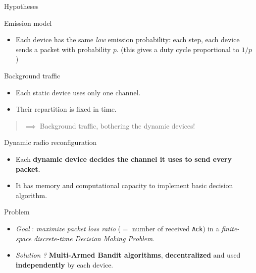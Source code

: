 \documentclass[12pt,english,ignorenonframetext,]{beamer}
\providecommand{\tightlist}{%
  \setlength{\itemsep}{0pt}\setlength{\parskip}{0pt}}
\begin{document}
\begin{frame}{Hypotheses}

\begin{block}{Emission model}

\begin{itemize}
\tightlist
\item
  Each device has the same \emph{low} emission probability: \newline
   each step, each device sends a packet with probability \(p\).
  \newline
   \hfill{}\small{(this gives a duty cycle proportional to $1/p$)}
\end{itemize}

\end{block}

\begin{block}{Background traffic}

\begin{itemize}
\tightlist
\item
  Each static device uses only one channel.
\item
  Their repartition is fixed in time.
\end{itemize}

\end{block}

\begin{quote}
\(\implies\) Background traffic, bothering the dynamic devices!
\end{quote}

\begin{block}{Dynamic radio reconfiguration}

\begin{itemize}
\tightlist
\item
  Each \textbf{dynamic device decides the channel it uses to send every
  packet}.
\item
  It has memory and computational capacity to implement basic decision
  algorithm.
\end{itemize}

\end{block}

\begin{block}{Problem}

\begin{itemize}
\tightlist
\item
  \emph{Goal} : \emph{maximize packet loss ratio} (\(=\) number of
  received \texttt{Ack}) in a \emph{finite-space discrete-time Decision
  Making Problem}.
\item
  \emph{Solution ?} \textbf{Multi-Armed Bandit algorithms},
  \textbf{decentralized} and used \textbf{independently} by each device.
\end{itemize}

\end{block}

\end{frame}
\end{document}
